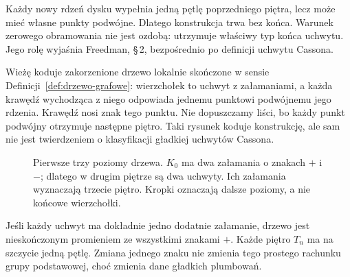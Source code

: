 Każdy nowy rdzeń dysku wypełnia jedną pętlę
poprzedniego piętra, lecz może mieć własne punkty
podwójne. Dlatego konstrukcja trwa bez końca.
Warunek zerowego obramowania nie jest ozdobą:
utrzymuje właściwy typ końca uchwytu. Jego rolę
wyjaśnia Freedman, \S\,2, bezpośrednio po definicji
uchwytu Cassona.

Wieżę koduje zakorzenione drzewo lokalnie skończone
w sensie Definicji~\ref{def:drzewo-grafowe}:
wierzchołek to uchwyt z załamaniami, a każda krawędź
wychodząca z niego odpowiada jednemu punktowi
podwójnemu jego rdzenia. Krawędź nosi znak tego
punktu. Nie dopuszczamy liści, bo każdy punkt
podwójny otrzymuje następne piętro. Taki rysunek
koduje konstrukcję, ale sam nie jest twierdzeniem
o klasyfikacji gładkiej uchwytów Cassona.

\begin{figure}[htbp]
\centering
{}
\caption{Pierwsze trzy poziomy drzewa. $K_0$ ma
dwa załamania o znakach $+$ i $-$; dlatego w drugim
piętrze są dwa uchwyty. Ich załamania wyznaczają
trzecie piętro. Kropki oznaczają dalsze poziomy,
a nie końcowe wierzchołki.}
\label{fig:casson-signed-tree}
\end{figure}

\begin{przyklad}
\label{prz:casson-ray}
Jeśli każdy uchwyt ma dokładnie jedno dodatnie
załamanie, drzewo jest nieskończonym promieniem
ze wszystkimi znakami $+$. Każde piętro $T_n$
ma na szczycie jedną pętlę. Zmiana jednego znaku
nie zmienia tego prostego rachunku grupy podstawowej,
choć zmienia dane gładkich plumbowań.
\end{przyklad}

